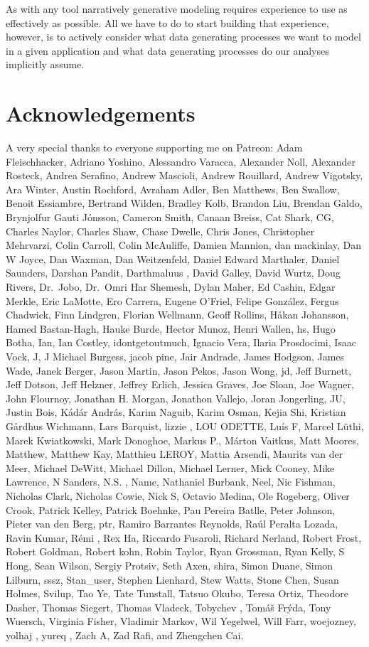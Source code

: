 \documentclass[
  letterpaper,
  DIV=11,
  numbers=noendperiod]{scrartcl}
\begin{document}
As with any tool narratively generative modeling requires experience to
use as effectively as possible. All we have to do to start building that
experience, however, is to actively consider what data generating
processes we want to model in a given application and what data
generating processes do our analyses implicitly assume.

\section*{Acknowledgements}\label{acknowledgements}

A very special thanks to everyone supporting me on Patreon: Adam
Fleischhacker, Adriano Yoshino, Alessandro Varacca, Alexander Noll,
Alexander Rosteck, Andrea Serafino, Andrew Mascioli, Andrew Rouillard,
Andrew Vigotsky, Ara Winter, Austin Rochford, Avraham Adler, Ben
Matthews, Ben Swallow, Benoit Essiambre, Bertrand Wilden, Bradley Kolb,
Brandon Liu, Brendan Galdo, Brynjolfur Gauti Jónsson, Cameron Smith,
Canaan Breiss, Cat Shark, CG, Charles Naylor, Charles Shaw, Chase
Dwelle, Chris Jones, Christopher Mehrvarzi, Colin Carroll, Colin
McAuliffe, Damien Mannion, dan mackinlay, Dan W Joyce, Dan Waxman, Dan
Weitzenfeld, Daniel Edward Marthaler, Daniel Saunders, Darshan Pandit,
Darthmaluus , David Galley, David Wurtz, Doug Rivers, Dr.~Jobo, Dr.~Omri
Har Shemesh, Dylan Maher, Ed Cashin, Edgar Merkle, Eric LaMotte, Ero
Carrera, Eugene O'Friel, Felipe González, Fergus Chadwick, Finn
Lindgren, Florian Wellmann, Geoff Rollins, Håkan Johansson, Hamed
Bastan-Hagh, Hauke Burde, Hector Munoz, Henri Wallen, hs, Hugo Botha,
Ian, Ian Costley, idontgetoutmuch, Ignacio Vera, Ilaria Prosdocimi,
Isaac Vock, J, J Michael Burgess, jacob pine, Jair Andrade, James
Hodgson, James Wade, Janek Berger, Jason Martin, Jason Pekos, Jason
Wong, jd, Jeff Burnett, Jeff Dotson, Jeff Helzner, Jeffrey Erlich,
Jessica Graves, Joe Sloan, Joe Wagner, John Flournoy, Jonathan H.
Morgan, Jonathon Vallejo, Joran Jongerling, JU, Justin Bois, Kádár
András, Karim Naguib, Karim Osman, Kejia Shi, Kristian Gårdhus Wichmann,
Lars Barquist, lizzie , LOU ODETTE, Luís F, Marcel Lüthi, Marek
Kwiatkowski, Mark Donoghoe, Markus P., Márton Vaitkus, Matt Moores,
Matthew, Matthew Kay, Matthieu LEROY, Mattia Arsendi, Maurits van der
Meer, Michael DeWitt, Michael Dillon, Michael Lerner, Mick Cooney, Mike
Lawrence, N Sanders, N.S. , Name, Nathaniel Burbank, Neel, Nic Fishman,
Nicholas Clark, Nicholas Cowie, Nick S, Octavio Medina, Ole Rogeberg,
Oliver Crook, Patrick Kelley, Patrick Boehnke, Pau Pereira Batlle, Peter
Johnson, Pieter van den Berg, ptr, Ramiro Barrantes Reynolds, Raúl
Peralta Lozada, Ravin Kumar, Rémi , Rex Ha, Riccardo Fusaroli, Richard
Nerland, Robert Frost, Robert Goldman, Robert kohn, Robin Taylor, Ryan
Grossman, Ryan Kelly, S Hong, Sean Wilson, Sergiy Protsiv, Seth Axen,
shira, Simon Duane, Simon Lilburn, sssz, Stan\_user, Stephen Lienhard,
Stew Watts, Stone Chen, Susan Holmes, Svilup, Tao Ye, Tate Tunstall,
Tatsuo Okubo, Teresa Ortiz, Theodore Dasher, Thomas Siegert, Thomas
Vladeck, Tobychev , Tomáš Frýda, Tony Wuersch, Virginia Fisher, Vladimir
Markov, Wil Yegelwel, Will Farr, woejozney, yolhaj , yureq , Zach A, Zad
Rafi, and Zhengchen Cai.
\end{document}
